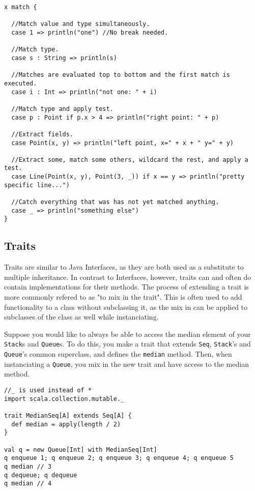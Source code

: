 \begin{lstlisting}[caption=Scala Pattern Matching,label=lst:scala:patterns]
x match {

  //Match value and type simultaneously.
  case 1 => println("one") //No break needed.

  //Match type.
  case s : String => println(s)

  //Matches are evaluated top to bottom and the first match is executed.
  case i : Int => println("not one: " + i)

  //Match type and apply test.
  case p : Point if p.x > 4 => println("right point: " + p)

  //Extract fields.
  case Point(x, y) => println("left point, x=" + x + " y=" + y)

  //Extract some, match some others, wildcard the rest, and apply a test.
  case Line(Point(x, y), Point(3, _)) if x == y => println("pretty specific line...")

  //Catch everything that was has not yet matched anything.
  case _ => println("something else")
}
\end{lstlisting}


\subsection{Traits}

Traits are similar to Java Interfaces, as they are both used as a substitute to multiple inheritance. In contrast to Interfaces, however, traits can and often do contain implementations for their methods. The process of extending a trait is more commonly refered to as "to mix in the trait". This is often used to add functionality to a class without subclassing it, as the mix in can be applied to subclasses of the class as well while instanciating.

Suppose you would like to always be able to access the median element of your \lstinline!Stack!s and \lstinline!Queue!s. To do this, you make a trait that extends \lstinline!Seq!, \lstinline!Stack!'s and \lstinline!Queue!'s common superclass, and defines the \lstinline!median! method. Then, when instanciating a \lstinline!Queue!, you mix in the new trait and have access to the median method.

\begin{lstlisting}[caption=Scala Pattern Matching,label=lst:scala:patterns]
//_ is used instead of *
import scala.collection.mutable._

trait MedianSeq[A] extends Seq[A] {
  def median = apply(length / 2)
}

val q = new Queue[Int] with MedianSeq[Int]
q enqueue 1; q enqueue 2; q enqueue 3; q enqueue 4; q enqueue 5
q median // 3
q dequeue; q dequeue
q median // 4
\end{lstlisting}


